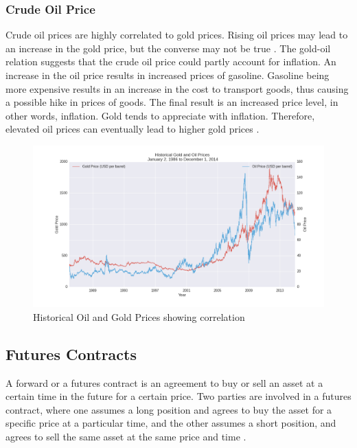 \documentclass[runningheads]{llncs}
\begin{document}
\subsubsection{Crude Oil Price}
Crude oil prices are highly correlated to gold prices. Rising oil prices may lead to an increase in the gold price, but the converse may not be true \cite{gold-shafiee}\cite{gold-zhang}.
The gold-oil relation suggests that the crude oil price could partly account for inflation. An increase in the oil price results in increased prices of gasoline. Gasoline being more expensive results in an increase in the cost to transport goods, thus causing a possible hike in prices of goods. The final result is an increased price level, in other words, inflation. Gold tends to appreciate with inflation. Therefore, elevated oil prices can eventually lead to higher gold prices \cite{gold-url1}. 

\begin{figure}
\centering
\includegraphics[width=\textwidth]{OilvsGold.png}
\caption{Historical Oil and Gold Prices showing correlation}
\label{fig:OilvsGold.png}
\end{figure}

\newpage

\subsection {Futures Contracts}

\noindent A forward or a futures contract is an agreement to buy or sell an asset at a certain time in the future for a certain price.  Two parties are involved in a futures contract, where one assumes a long position and agrees to buy the asset for a specific price at a particular time, and the other assumes a short position, and agrees to sell the same asset at the same price and time \cite{futuresbook}. \\
\end{document}
